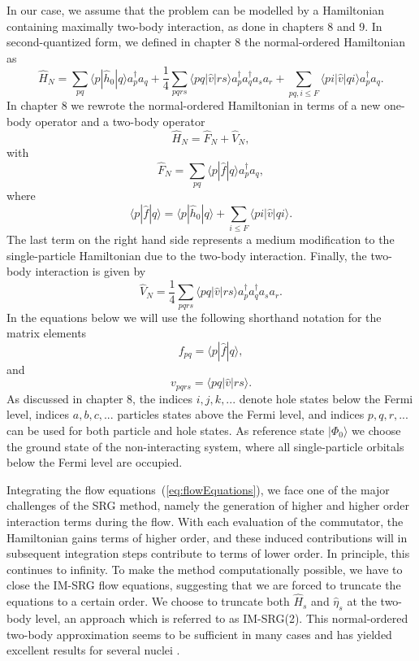 In our case, we assume that the problem can be modelled by a
Hamiltonian containing maximally two-body interaction, as done in chapters 8 and 9. In
second-quantized form, we defined in chapter 8 the normal-ordered Hamiltonian as
\[
\hat{H}_N = \sum_{pq} \langle p|\hat{h}_0|q\rangle a^\dagger_p
a_q+\frac{1}{4} \sum_{pqrs} \langle pq|\hat{v}|rs\rangle a^\dagger_p a^\dagger_q a_s a_r+\sum_{pq,i\le F}
\langle pi|\hat{v}|qi\rangle a^\dagger_p a_q.
\]
In chapter 8 we rewrote the normal-ordered Hamiltonian 
in terms of a new one-body operator and a two-body operator
\[
\hat{H}_N=\hat{F}_N+\hat{V}_N,
\]
with
\[
\hat{F}_N=\sum_{pq} \langle p|\hat{f}|q\rangle a^\dagger_pa_q,
\]
where
\[
\langle p|\hat{f}|q\rangle= \langle p|\hat{h}_0|q\rangle +\sum_{i\le F}
\langle pi|\hat{v}|qi\rangle.
\]
The last term on the right hand side represents a medium modification
to the single-particle Hamiltonian due to the two-body interaction.
Finally, the two-body interaction is given by
\[
\hat{V}_N = \frac{1}{4} \sum_{pqrs} \langle pq|\hat{v}|rs\rangle a^\dagger_p a^\dagger_q a_s a_r.
\]
In the equations below we will use the following shorthand notation for the matrix elements
\[
f_{pq}=\langle p|\hat{f}|q\rangle,
\]
and 
\[
v_{pqrs}= \langle pq|\hat{v}|rs\rangle.
\]
As discussed in chapter 8, the indices $i,j,k,...$
denote hole states below the Fermi level, indices $a,b,c,...$
particles states above the Fermi level, and indices $ p,q,r,...$ can
be used for both particle and hole states. As reference state
$|\Phi_0\rangle$ we choose the ground state of the non-interacting
system, where all single-particle orbitals below the Fermi level are
occupied.

Integrating the flow equations~(\ref{eq:flowEquations}), we face one
of the major challenges of the SRG method, namely the generation of
higher and higher order interaction terms during the flow. With each
evaluation of the commutator, the Hamiltonian gains terms of higher
order, and these induced contributions will in subsequent integration
steps contribute to terms of lower order. In principle, this continues
to infinity. 
To make the method computationally possible, we have to
close the IM-SRG flow equations, suggesting that we are forced to
truncate the equations to a certain order. We choose to truncate both
$\hat{H}_s$ and $\hat{\eta}_s$ at the two-body level, an approach
which is referred to as IM-SRG(2).  This normal-ordered two-body
approximation seems to be sufficient in many cases and has yielded
excellent results for several nuclei
\cite{Tsukiyama:2011uq,Tsukiyama:2012fk,Hergert:2016jk,Hergert:2016ng}.

